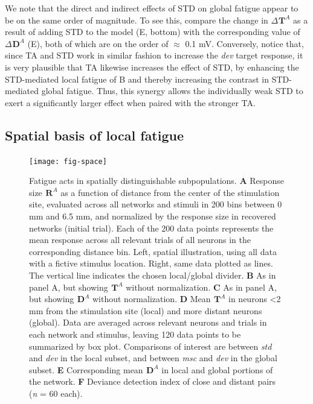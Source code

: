 \documentclass[9pt,lineno,onehalfspacing]{elife}
\newcommand{\dev}{\textit{dev}}
\newcommand{\msc}{\textit{msc}}
\newcommand{\std}{\textit{std}}
\newcommand{\R}[3][]{{}^{#1}_{}\boldsymbol R^{#2}_{#3}}
\newcommand{\T}[3][]{{}^{#1}_{}\boldsymbol T^{#2}_{#3}}
\newcommand{\D}[3][]{{}^{#1}_{}\boldsymbol D^{#2}_{#3}}
\begin{document}
We note that the direct and indirect effects of STD on global fatigue appear to be on the same order of magnitude. To see this, compare the change in $\Delta \T{A}{}$ as a result of adding STD to the model (E, bottom) with the corresponding value of $\Delta \D{A}{}$ (E), both of which are on the order of $\approx$ 0.1 mV. Conversely, notice that, since TA and STD work in similar fashion to increase the \dev{} target response, it is very plausible that TA likewise increases the effect of STD, by enhancing the STD-mediated local fatigue of B and thereby increasing the contrast in STD-mediated global fatigue. Thus, this synergy allows the individually weak STD to exert a significantly larger effect when paired with the stronger TA.

\subsection{Spatial basis of local fatigue}

\begin{figure}
    \texttt{[image: fig-space]}
    \caption{%
        Fatigue acts in spatially distinguishable subpopulations.
        \textbf{A} Response size $\R{A}{}$ as a function of distance from the center of the stimulation site, evaluated across all networks and stimuli in 200 bins between 0 mm and 6.5 mm, and normalized by the response size in recovered networks (initial trial). Each of the 200 data points represents the mean response across all relevant trials of all neurons in the corresponding distance bin. Left, spatial illustration, using all data with a fictive stimulus location. Right, same data plotted as lines. The vertical line indicates the chosen local/global divider.
        \textbf{B} As in panel A, but showing $\T{A}{}$ without normalization.
        \textbf{C} As in panel A, but showing $\D{A}{}$ without normalization.
        \textbf{D} Mean $\T{A}{}$ in neurons <2 mm from the stimulation site (local) and more distant neurons (global). Data are averaged across relevant neurons and trials in each network and stimulus, leaving 120 data points to be summarized by box plot. Comparisons of interest are between \std{} and \dev{} in the local subset, and between \msc{} and \dev{} in the global subset.
        \textbf{E} Corresponding mean $\D{A}{}$ in local and global portions of the network.
        \textbf{F} Deviance detection index of close and distant pairs (\textit{n} = 60 each).
    }
    \label{fig:space}
\end{figure}
\end{document}
